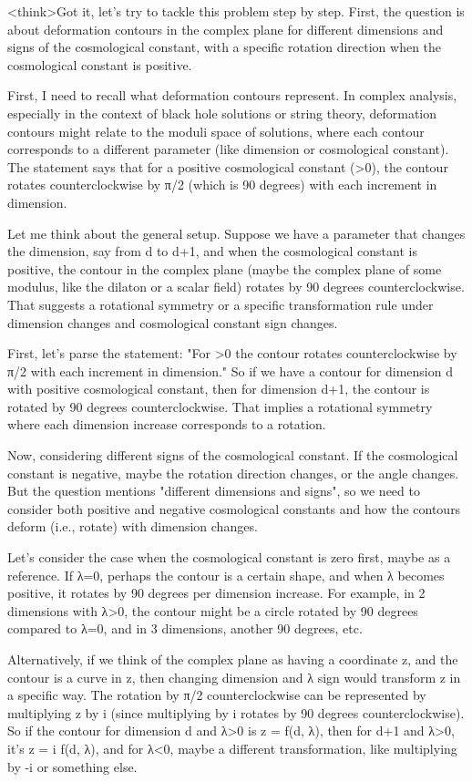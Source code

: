 <think>Got it, let's try to tackle this problem step by step. First, the question is about deformation contours in the complex plane for different dimensions and signs of the cosmological constant, with a specific rotation direction when the cosmological constant is positive. 

First, I need to recall what deformation contours represent. In complex analysis, especially in the context of black hole solutions or string theory, deformation contours might relate to the moduli space of solutions, where each contour corresponds to a different parameter (like dimension or cosmological constant). The statement says that for a positive cosmological constant (>0), the contour rotates counterclockwise by π/2 (which is 90 degrees) with each increment in dimension. 

Let me think about the general setup. Suppose we have a parameter that changes the dimension, say from d to d+1, and when the cosmological constant is positive, the contour in the complex plane (maybe the complex plane of some modulus, like the dilaton or a scalar field) rotates by 90 degrees counterclockwise. That suggests a rotational symmetry or a specific transformation rule under dimension changes and cosmological constant sign changes.

First, let's parse the statement: "For >0 the contour rotates counterclockwise by π/2 with each increment in dimension." So if we have a contour for dimension d with positive cosmological constant, then for dimension d+1, the contour is rotated by 90 degrees counterclockwise. That implies a rotational symmetry where each dimension increase corresponds to a rotation. 

Now, considering different signs of the cosmological constant. If the cosmological constant is negative, maybe the rotation direction changes, or the angle changes. But the question mentions "different dimensions and signs", so we need to consider both positive and negative cosmological constants and how the contours deform (i.e., rotate) with dimension changes.

Let's consider the case when the cosmological constant is zero first, maybe as a reference. If λ=0, perhaps the contour is a certain shape, and when λ becomes positive, it rotates by 90 degrees per dimension increase. For example, in 2 dimensions with λ>0, the contour might be a circle rotated by 90 degrees compared to λ=0, and in 3 dimensions, another 90 degrees, etc. 

Alternatively, if we think of the complex plane as having a coordinate z, and the contour is a curve in z, then changing dimension and λ sign would transform z in a specific way. The rotation by π/2 counterclockwise can be represented by multiplying z by i (since multiplying by i rotates by 90 degrees counterclockwise). So if the contour for dimension d and λ>0 is z = f(d, λ), then for d+1 and λ>0, it's z = i f(d, λ), and for λ<0, maybe a different transformation, like multiplying by -i or something else.

